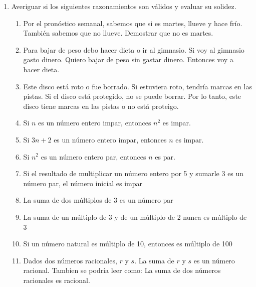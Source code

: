 \documentclass[a4paper]{article}
\newcommand{\exercise}{\item}
\newcommand{\then}{\to}
\newcommand{\eq}{\leftrightarrow}
\newcommand{\xor}{\veebar}
\begin{document}
\begin{enumerate}[resume]
\begin{enumerate} [label=(\alph*)]
		\item $(p \land \neg q) \then \neg (r \then \neg s)$ es F. Averiguar el valor de $p$, $q$, $r$ y $s$.
		\item $((p \then q) \eq t) \lor (p \then t)$ es F. Averiguar el valor de $p$, $q$ y $t$.
		\item $((s \then p) \then (p \eq q)) \lor (p \land r)$ es F y $s$ es V. Averiguar el valor de $p$, $q$ y $r$.
		\item $\neg \left( (p \then q) \to s(s \then r)\right)$ es V. Averiguar el valor de $(\neg q \then \neg p) \xor (r \then s)$ y de $(\neg p \lor q) \land (s \land \neg r)$
		\item $\left(((p \xor q) \land r) \then (s \eq r) \right) \lor \left((q \then p) \then (\neg s \land t)\right)$ es F. Averiguar el valor de $p \then q$, de $r \xor s$ y de $(p \lor q) \then (\neg s \xor t)$
	\end{enumerate}
	\exercise Averiguar si los siguientes razonamientos son válidos y evaluar su solidez.
	\begin{enumerate} [label=(\alph*)]
		\item Por el pronóstico semanal, sabemos que si es martes, llueve y hace frío. También sabemos que no llueve. Demostrar que no es martes.
		\item Para bajar de peso debo hacer dieta o ir al gimnasio. Si voy al gimnasio gasto dinero. Quiero bajar de peso sin gastar dinero. Entonces voy a hacer dieta. 
		\item Este disco está roto o fue borrado. Si estuviera roto, tendría marcas en las pistas. Si el disco está protegido, no se puede borrar. Por lo tanto, este disco tiene marcas en las pistas o no está proteigo.
		\item Si $n$ es un número entero impar, entonces $n^2$ es impar.
		\item Si $3n+2$ es un número entero impar, entonces $n$ es impar.
		\item Si $n^2$ es un número entero par, entonces $n$ es par.
		\item Si el resultado de multiplicar un número entero por 5 y sumarle 3 es un número par, el número inicial es impar
		\item La suma de dos múltiplos de 3 es un número par
		\item La suma de un múltiplo de 3 y de un múltiplo de 2 nunca es múltiplo de 3
		\item Si un número natural es múltiplo de 10, entonces es múltiplo de 100
		\item Dados dos números racionales, $r$ y $s$. La suma de $r$ y $s$ es un número racional. Tambien se podría leer como: La suma de dos números racionales es racional. 

\end{enumerate}
\end{enumerate}
\end{document}
